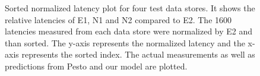 \begin{figure}[!t]
\centering
{}
\caption{Sorted normalized latency plot for four test data stores.
It shows the relative latencies of E1, N1 and N2 compared to E2.
The 1600 latencies measured from each data store were normalized by E2 and than sorted.
The y-axis represents the normalized latency and the x-axis represents the sorted index.
The actual measurements as well as predictions from Pesto and our model are plotted.
}
\label{sortedLatency}
\end{figure}

